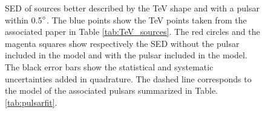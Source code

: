 \begin{figure}[h!]
\centering


\caption{\label{fig:sedsourcespuls3}SED of sources better described by the TeV shape and with a pulsar within 0.5$\mbox{$^\circ$}$. The blue points show the TeV points taken from the associated paper in Table \ref{tab:TeV_sources}. The red circles and the magenta squares show respectively the SED without the pulsar included in the model and with the pulsar included in the model. The black error bars show the statistical and   systematic uncertainties added in quadrature. The dashed line corresponds to the model of the associated pulsars summarized in Table. \ref{tab:pulsarfit}.}
\end{figure}

